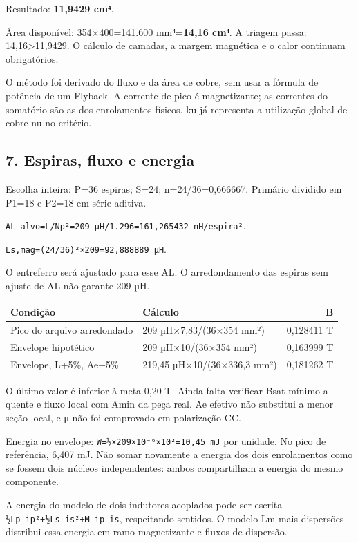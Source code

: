 \documentclass[
]{article}
\begin{document}
Resultado: \textbf{11,9429 cm⁴}.

Área disponível: 354×400=141.600 mm⁴=\textbf{14,16 cm⁴}. A triagem
passa: 14,16\textgreater11,9429. O cálculo de camadas, a margem
magnética e o calor continuam obrigatórios.

O método foi derivado do fluxo e da área de cobre, sem usar a fórmula de
potência de um Flyback. A corrente de pico é magnetizante; as correntes
do somatório são as dos enrolamentos físicos. ku já representa a
utilização global de cobre nu no critério.

\subsection{7. Espiras, fluxo e energia}\label{espiras-fluxo-e-energia}

Escolha inteira: P=36 espiras; S=24; n=24/36=0,666667. Primário dividido
em P1=18 e P2=18 em série aditiva.

\texttt{AL\_alvo=L/Np²=209\ µH/1.296=161,265432\ nH/espira²}.

\texttt{Ls,mag=(24/36)²×209=92,888889\ µH}.

O entreferro será ajustado para esse AL. O arredondamento das espiras
sem ajuste de AL não garante 209 µH.

\begin{longtable}[]{@{}llr@{}}
\toprule\noalign{}
Condição & Cálculo & B \\
\midrule\noalign{}
\endhead
\bottomrule\noalign{}
\endlastfoot
Pico do arquivo arredondado & 209 µH×7,83/(36×354 mm²) & 0,128411 T \\
Envelope hipotético & 209 µH×10/(36×354 mm²) & 0,163999 T \\
Envelope, L+5\%, Ae−5\% & 219,45 µH×10/(36×336,3 mm²) & 0,181262 T \\
\end{longtable}

O último valor é inferior à meta 0,20 T. Ainda falta verificar Bsat
mínimo a quente e fluxo local com Amin da peça real. Ae efetivo não
substitui a menor seção local, e μ não foi comprovado em polarização CC.

Energia no envelope: \texttt{W=½×209×10⁻⁶×10²=10,45\ mJ} por unidade. No
pico de referência, 6,407 mJ. Não somar novamente a energia dos dois
enrolamentos como se fossem dois núcleos independentes: ambos
compartilham a energia do mesmo componente.

A energia do modelo de dois indutores acoplados pode ser escrita
\texttt{½Lp\ ip²+½Ls\ is²+M\ ip\ is}, respeitando sentidos. O modelo Lm
mais dispersões distribui essa energia em ramo magnetizante e fluxos de
dispersão.
\end{document}

